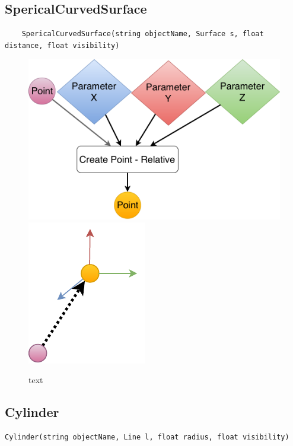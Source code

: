 \subsection{SpericalCurvedSurface}
\begin{lstlisting}
    SpericalCurvedSurface(string objectName, Surface s, float distance, float visibility)
\end{lstlisting}

\begin{figure}[H]
	\centering
	\includegraphics[height=0.3\textwidth]{obrazky-figures/Diagram/DP Navrh operacii-0D - Point2.pdf}
	\includegraphics[height=0.3\textwidth]{obrazky-figures/Diagram/Draw/1Points/DP Navrh operacii-0D - PointRelative.pdf}
	\caption{text}
	\label{fig:1}
\end{figure}



\subsection{Cylinder}
\begin{lstlisting}
Cylinder(string objectName, Line l, float radius, float visibility)
\end{lstlisting}

